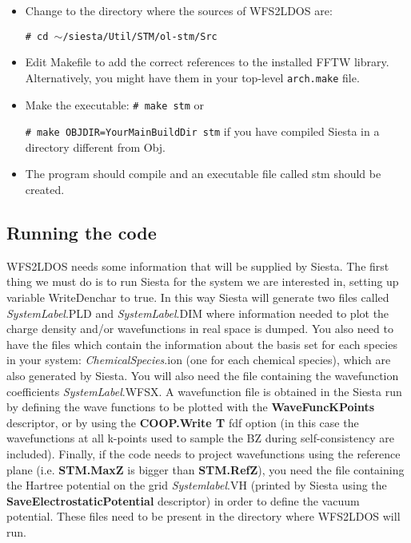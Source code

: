   \begin{itemize}

   \item Change to the directory where the sources of {\sc WFS2LDOS} are:

         {\tt \# cd $\sim$/siesta/Util/STM/ol-stm/Src}

   \item Edit Makefile to add the correct references to the installed
     FFTW library. Alternatively, you might have them in your top-level
     \texttt{arch.make} file.

   \item Make the executable:
         {\tt \# make stm} or
     
         {\tt \# make OBJDIR=YourMainBuildDir stm} if you have
         compiled Siesta in a directory different from Obj.

   \item The program should compile and an executable file called
         stm should be created.

  \end{itemize}

\subsection{Running the code}

 {\sc WFS2LDOS} needs some information that will be supplied by {\sc Siesta}. 
 The first thing we must do is to run {\sc Siesta} for 
 the system we are interested in,
 setting up variable WriteDenchar to true. 
 In this way {\sc Siesta} will generate
 two files called {\it SystemLabel}.PLD and {\it SystemLabel}.DIM
 where information 
 needed to plot the charge density and/or wavefunctions 
 in real space is dumped. You also need to have the files which
 contain the information about the basis set for each species
 in your system: {\it ChemicalSpecies}.ion (one for each
 chemical species), which
 are also generated by  {\sc Siesta}.
 You will also need the file containing the
 wavefunction coefficients {\it SystemLabel}.WFSX. 
 A wavefunction file is obtained
 in the {\sc Siesta} run by defining the wave functions to be
 plotted with the {\bf WaveFuncKPoints} descriptor, or by using the
 {\bf COOP.Write T} fdf option (in this case the
 wavefunctions at all k-points used to sample the BZ during
 self-consistency are included).
 Finally, if the code needs to project wavefunctions using the reference plane
 (i.e. {\bf STM.MaxZ} is bigger than {\bf STM.RefZ}), you need the file 
 containing the Hartree potential on the grid {\it Systemlabel}.VH (printed by {\sc Siesta}
 using the {\bf SaveElectrostaticPotential} descriptor)
 in order to define the vacuum potential. 
 These files need to be present in the
 directory where {\sc WFS2LDOS} will run.


